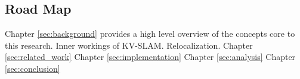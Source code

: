 \subsection{Road Map}

Chapter \ref{sec:background} provides a high level overview of the concepts core to this research. Inner workings of KV-SLAM. Relocalization. 
Chapter \ref{sec:related_work}
Chapter \ref{sec:implementation}
Chapter \ref{sec:analysis}
Chapter \ref{sec:conclusion}